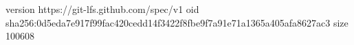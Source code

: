 version https://git-lfs.github.com/spec/v1
oid sha256:0d5eda7e917f99fac420cedd14f3422f8fbe9f7a91e71a1365a405afa8627ac3
size 100608
